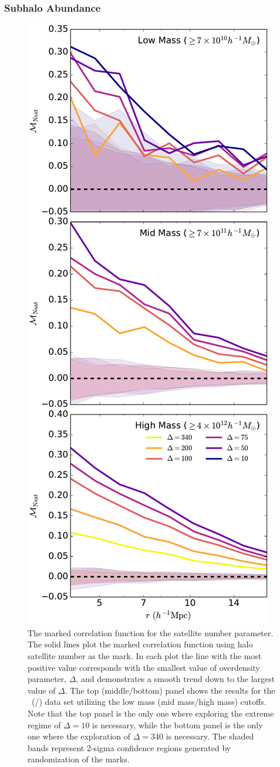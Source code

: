 \documentclass[usenatbib]{mnras}
\begin{document}
\subsubsection{Subhalo Abundance}

\begin{figure}
	\centering
	\includegraphics[width=.4\textwidth]{all_mcf_nsat.pdf}
	\caption{The marked correlation function for the satellite number parameter. The solid lines plot the marked correlation function using halo satellite number as the mark. In each plot the line with the most 
positive value corresponds with the smallest value of overdensity parameter, 
$\Delta$, and demonstrates a smooth trend down to the largest value of 
$\Delta$. The top (middle/bottom) panel shows the results for the
\simA \ (\simB /\simC) data set utilizing the low mass (mid mass/high mass) cutoffs. Note
that the top panel is the only one where exploring the extreme regime of $\Delta = 10$ is
necessary, while the bottom panel is the only one where the exploration of $\Delta = 340$
is necessary. The shaded bands represent 2-sigma confidence regions generated by randomization of the marks.}
	\label{fig:cc_mcf_nsat}
\end{figure}
\end{document}
